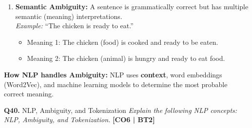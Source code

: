 \documentclass[12pt,a4paper]{article}
\newcommand{\Qno}[1]{\textbf{\color{darkred}Q#1.}}
\newcommand{\term}[1]{\textbf{\color{headingcolor}#1}}
\begin{document}
\begin{answerenv}
\begin{enumerate}[leftmargin=1.8em, itemsep=8pt]
  \item \term{Semantic Ambiguity:} A sentence is grammatically correct but has multiple semantic (meaning) interpretations.\\
  \textit{Example:} ``The chicken is ready to eat.''
  \begin{itemize}[leftmargin=1.5em]
    \item Meaning 1: The chicken (food) is cooked and ready to be eaten.
    \item Meaning 2: The chicken (animal) is hungry and ready to eat food.
  \end{itemize}
\end{enumerate}

\begin{keypoint}
\textbf{How NLP handles Ambiguity:} NLP uses \textbf{context}, word embeddings (Word2Vec), and machine learning models to determine the most probable correct meaning.
\end{keypoint}

\end{answerenv}

\vspace{8pt}

\begin{questionbox}{\Qno{40} NLP, Ambiguity, and Tokenization}
\textit{Explain the following NLP concepts: NLP, Ambiguity, and Tokenization.} \hfill \textbf{[CO6 | BT2]}
\end{questionbox}
\end{document}
